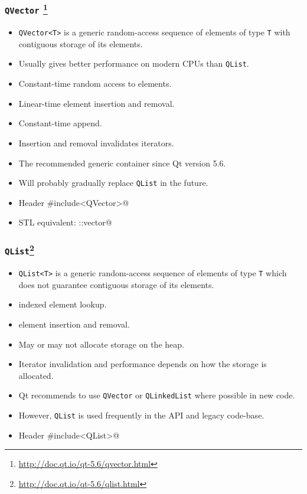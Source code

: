 \begin{frame}[fragile]
  \frametitle{\texttt{QVector}
    \footnote{\url{http://doc.qt.io/qt-5.6/qvector.html}}}
  \begin{itemize}
    \item \texttt{QVector<T>} is a generic random-access sequence of elements of
    type \texttt{T} with contiguous storage of its elements.
    \item Usually gives better performance on modern CPUs than \texttt{QList}.
    \item Constant-time random access to elements.
    \item Linear-time element insertion and removal.
    \item Constant-time append.
    \item Insertion and removal invalidates iterators.
    \item The recommended generic container since Qt version 5.6.
    \item Will probably gradually replace \texttt{QList} in the future.
    \item Header \verb@#include<QVector>@
    \item STL equivalent: \verb@std::vector@
  \end{itemize}
\end{frame}

\begin{frame}[fragile]
  \frametitle{\texttt{QList}\footnote
    {\url{http://doc.qt.io/qt-5.6/qlist.html}}}
  \begin{itemize}
    \item \texttt{QList<T>} is a generic random-access sequence of elements of
    type \texttt{T} which does not guarantee contiguous storage of its elements.
    \item {} indexed element lookup.
    \item {} element insertion and removal.
    \item May or may not allocate storage on the heap.
    \item Iterator invalidation and performance depends on how the storage
    is allocated.
    \item Qt recommends to use \texttt{QVector} or \texttt{QLinkedList}
    where possible in new code.
    \item However, \texttt{QList} is used frequently in the API and legacy
    code-base.
    \item Header \verb@#include<QList>@
  \end{itemize}
\end{frame}


